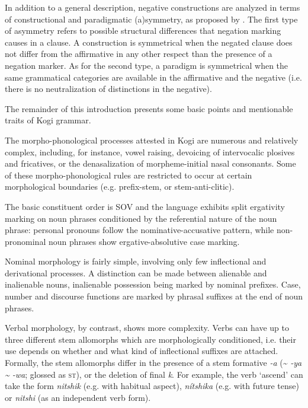 \documentclass[output=paper,colorlinks,citecolor=brown]{langscibook}
\begin{document}
In addition to a general description, negative constructions are analyzed in terms of constructional and paradigmatic (a)symmetry, as proposed by \citet{Miestamo2005}. The first type of asymmetry refers to possible structural differences that negation marking causes in a clause. A construction is symmetrical when the negated clause does not differ from the affirmative in any other respect than the presence of a negation marker. As for the second type, a paradigm is symmetrical when the same grammatical categories are available in the affirmative and the negative (i.e. there is no neutralization of distinctions in the negative).

The remainder of this introduction presents some basic points and mentionable traits of Kogi grammar.

The morpho-phonological processes attested in Kogi are numerous and relatively complex, including, for instance, vowel raising, devoicing of intervocalic plosives and fricatives, or the denasalization of morpheme-initial nasal consonants. Some of these morpho-phonological rules are restricted to occur at certain morphological boundaries (e.g. prefix-stem, or stem-anti-clitic).

The basic constituent order is SOV and the language exhibits split ergativity marking on noun phrases conditioned by the referential nature of the noun phrase: personal pronouns follow the nominative-accusative pattern, while non-pronominal noun phrases show ergative-absolutive case marking. 

Nominal morphology is fairly simple, involving only few inflectional and derivational processes. A distinction can be made between alienable and inalienable nouns, inalienable possession being marked by nominal prefixes. Case, number and discourse functions are marked by phrasal suffixes at the end of noun phrases.

Verbal morphology, by contrast, shows more complexity. Verbs can have up to three different stem allomorphs which are morphologically conditioned, i.e. their use depends on whether and what kind of inflectional suffixes are attached. Formally, the stem allomorphs differ in the presence of a stem formative \textit{\nobreakdash-a} ({\textasciitilde} \textit{{}-ya {\textasciitilde} {}-wa}; glossed as \textsc{st)}, or the deletion of final \textit{k}. For example, the verb ‘ascend’ can take the form \textit{nitshik} (e.g. with habitual aspect), \textit{n\'{i}tshika} (e.g. with future tense) or \textit{nitshi} (as an independent verb form).
\end{document}
